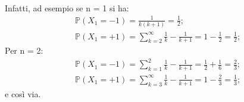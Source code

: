 \documentclass[11pt,largemargins]{homework}
\begin{document}
\begin{enumerate}
\begin{itemize}
\begin{align*}
\end{align*}
Infatti, ad esempio se n = 1 si ha:
\begin{align*}
&\mathbb{P}\left(X_1 = -1\right) = \frac{1}{k\left(k+1\right)}= \frac{1}{2}; \\
&\mathbb{P}\left(X_1 = +1\right) = \sum_{k=2}^{\infty}\frac{1}{k}-\frac{1}{k+1} = 1-\frac{1}{2} = \frac{1}{2};
\end{align*}
Per n = 2: 
\begin{align*}
&\mathbb{P}\left(X_1 = -1\right) =  \sum_{k=1}^{2}\frac{1}{k} - \frac{1}{k+1} = \frac{1}{2} + \frac{1}{6} = \frac{2}{3};\\
&\mathbb{P}\left(X_1 = +1\right) = \sum_{k=3}^{\infty}\frac{1}{k}-\frac{1}{k+1} = 1-\frac{2}{3} = \frac{1}{3};
\end{align*}
e così via. 
\end{itemize}
 

\end{enumerate}
\end{document}
